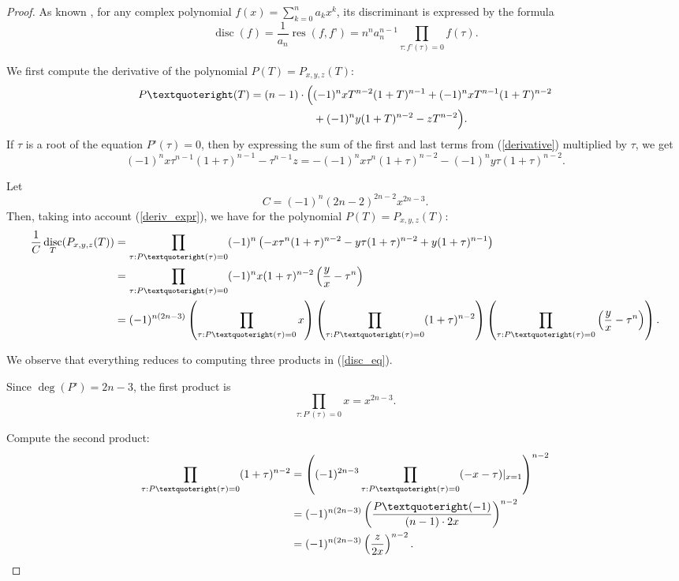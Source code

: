 \documentclass[14pt, dvipsnames]{extarticle}
\theoremstyle{definition}
\theoremstyle{definition}
\theoremstyle{remark}
\DeclareMathOperator{\res}{\mathrm{res}}
\DeclareMathOperator{\disc}{\mathrm{disc}}
\begin{document}
\begin{proof}
As known \cite[Theorem 1.3.3]{Prasolov_polynomials}, for any complex polynomial $f(x) = \sum\limits_{k=0}^n a_k x^k$, its discriminant is expressed by the formula
$$\disc(f) = \frac{1}{a_n} \res(f, f’) = n^n a_n^{n-1} \prod\limits_{\tau: f’(\tau) = 0} f(\tau).$$

We first compute the derivative of the polynomial $P(T) = P_{x, y, z}(T)$:
\begin{align}\label{derivative}
P’(T) = (n-1)\cdot\Big(&(-1)^n x T^{n-2} (1 + T)^{n-1} + (-1)^n x T^{n-1} (1 + T)^{n-2} \\
&\notag + (-1)^n y (1 + T)^{n-2} - z T^{n-2} \Big).
\end{align}
If $\tau$ is a root of the equation $P’(\tau) = 0$, then by expressing the sum of the first and last terms from (\ref{derivative}) multiplied by $\tau$, we get
\begin{equation}\label{deriv_expr}
(-1)^n x \tau^{n-1} (1 + \tau)^{n-1} - \tau^{n-1} z = -(-1)^n x \tau^n (1 + \tau)^{n-2} - (-1)^n y \tau (1 + \tau)^{n-2}.
\end{equation}

Let
\begin{equation}\label{const}
C = (-1)^n (2n - 2)^{2n - 2} x^{2n - 3}.
\end{equation}
Then, taking into account (\ref{deriv_expr}), we have for the polynomial $P(T) = P_{x, y, z}(T)$:
\begin{align}\label{disc_eq}
\frac{1}{C} \disc_T(P_{x, y, z}(T)) &= \prod\limits_{\tau: P’(\tau) = 0} (-1)^n \left( -x \tau^n (1 + \tau)^{n-2} - y \tau (1 + \tau)^{n-2} + y (1 + \tau)^{n-1} \right) \\
&= \prod\limits_{\tau: P’(\tau) = 0} (-1)^n x (1 + \tau)^{n-2} \left(\frac{y}{x} - \tau^n\right) \notag \\
&= (-1)^{n(2n-3)} \left( \prod\limits_{\tau: P’(\tau) = 0} x \right) \left( \prod\limits_{\tau: P’(\tau) = 0} (1 + \tau)^{n-2} \right) \left( \prod\limits_{\tau: P’(\tau) = 0} \left( \frac{y}{x} - \tau^n \right) \right). \notag
\end{align}

We observe that everything reduces to computing three products in (\ref{disc_eq}).

Since $\deg(P’) = 2n - 3$, the first product is
\begin{equation}\label{prod_1}
\prod\limits_{\tau: P’(\tau) = 0} x = x^{2n-3}.
\end{equation}

Compute the second product:
\begin{align}\label{prod_2}
\prod\limits_{\tau: P’(\tau) = 0} (1 + \tau)^{n-2} &= \left((-1)^{2n-3} \prod\limits_{\tau: P’(\tau) = 0}  (-x - \tau)|_{x = 1}\right)^{n-2} \\
&= (-1)^{n(2n-3)} \left( \frac{P’(-1)}{(n-1)\cdot 2x} \right)^{n-2} \notag \\
&= (-1)^{n(2n-3)} \left( \frac{z}{2x} \right)^{n-2}. \notag
\end{align}


\end{proof}
\end{document}
